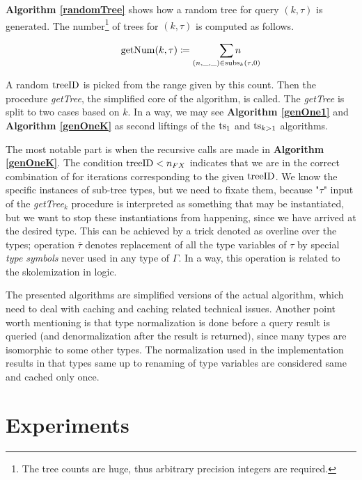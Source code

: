 \documentclass{ws-ijait}
\begin{document}
\textbf{Algorithm \ref{randomTree}} shows how a random tree for query $(k, \tau)$ is generated. The number\footnote{The tree counts are huge, thus arbitrary precision integers are required.} of trees for $(k,\tau)$ is computed as follows.

$$\op{getNum}(k,\tau) \defi \smashoperator[r]{\sum_{(n,\_,\_) \in \op{subs}_k(\tau,0)}}n$$

A random $\operatorname{treeID}$ is picked from the range given by this count. 
Then the procedure \textit{getTree}, the simplified core of the algorithm, is called. 
The \textit{getTree} is split to two cases based on $k$. 
In a way, we may see \textbf{Algorithm \ref{genOne1}} and \textbf{Algorithm \ref{genOneK}} as 
second liftings of the $\operatorname{ts}_1$ and $\operatorname{ts}_{k > 1}$ algorithms.

The most notable part is when the recursive calls are made in \textbf{Algorithm \ref{genOneK}}.
The condition $\operatorname{treeID} < n_{FX}$ indicates that we are in the correct combination of for iterations
corresponding to the given $\operatorname{treeID}$. We know the specific instances of sub-tree types, but we need to 
fixate them, because "$\tau$" input of the \textit{getTree$_k$} procedure is interpreted as something that may be instantiated, but we want to stop these instantiations from happening, since we have arrived at the desired type. 
This can be achieved by a trick denoted as overline over the types; 
operation $\overline{\tau}$ denotes replacement of all the type variables of $\tau$ by special \textit{type symbols} never used in any type of $\Gamma$. In a way, this operation is related to the skolemization in logic.


The presented algorithms are simplified versions of the actual algorithm, which need to deal with caching and caching related technical issues. Another point worth mentioning is that type normalization is done before a query result is queried (and denormalization after the result is returned), since many types are isomorphic to some other types. The normalization used in the implementation results in that types same up to renaming of type variables are considered same and cached only once.



\section{Experiments}
\end{document}
